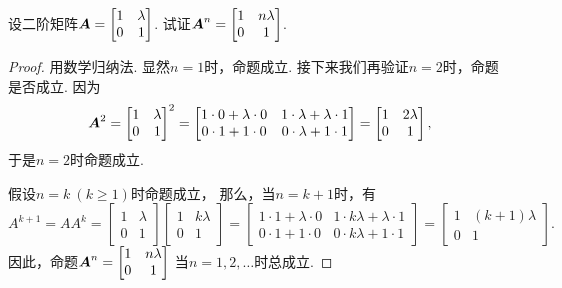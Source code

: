 \begin{example}
设二阶矩阵\(\boldsymbol{A}=\begin{bmatrix} 1 & \lambda \\ 0 & 1 \end{bmatrix}\).
试证\(\boldsymbol{A}^n=\begin{bmatrix} 1 & n\lambda \\ 0 & 1 \end{bmatrix}\).
\begin{proof}
用数学归纳法.
显然\(n=1\)时，命题成立.
接下来我们再验证\(n=2\)时，命题是否成立.
因为\begin{equation*}
	\boldsymbol{A}^2
	= \begin{bmatrix}
		1 & \lambda \\
		0 & 1
	\end{bmatrix}^2
	= \begin{bmatrix}
		1\cdot0+\lambda\cdot0 & 1\cdot\lambda+\lambda\cdot1 \\
		0\cdot1+1\cdot0 & 0\cdot\lambda+1\cdot1
	\end{bmatrix}
	= \begin{bmatrix}
		1 & 2\lambda \\
		0 & 1
	\end{bmatrix},
\end{equation*}
于是\(n=2\)时命题成立.

假设\(n=k\ (k\geq1)\)时命题成立，
那么，当\(n=k+1\)时，有\begin{equation*}
	A^{k+1}
	= A A^k
	= \begin{bmatrix}
		1 & \lambda \\
		0 & 1
	\end{bmatrix}
	\begin{bmatrix}
		1 & k\lambda \\
		0 & 1
	\end{bmatrix}
	= \begin{bmatrix}
		1\cdot1+\lambda\cdot0 & 1\cdot k\lambda+\lambda\cdot1 \\
		0\cdot1+1\cdot0 & 0\cdot k\lambda+1\cdot1
	\end{bmatrix}
	= \begin{bmatrix}
		1 & (k+1)\lambda \\
		0 & 1
	\end{bmatrix}.
\end{equation*}
因此，命题\(\boldsymbol{A}^n=\begin{bmatrix} 1 & n\lambda \\ 0 & 1 \end{bmatrix}\)
当\(n=1,2,\dotsc\)时总成立.
\end{proof}
\end{example}

